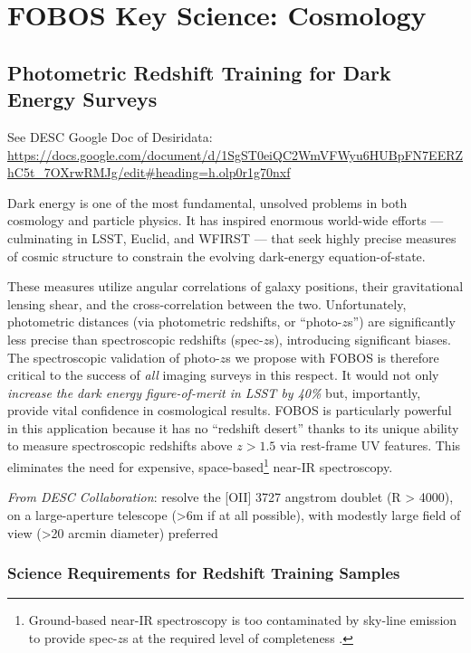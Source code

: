 \documentclass[preprint,11pt]{aastex}
\begin{document}
\section{FOBOS Key Science: Cosmology } \label{sec:cosmology}

\subsection{Photometric Redshift Training for Dark Energy Surveys}
\label{sec:photoz}

See DESC Google Doc of Desiridata: \url{https://docs.google.com/document/d/1SgST0eiQC2WmVFWyu6HUBpFN7EERZhC5t\_7OXrwRMJg/edit\#heading=h.olp0r1g70nxf}

Dark energy is one of
the most fundamental, unsolved problems in both cosmology and particle
physics.  It has inspired enormous world-wide efforts --- culminating in
LSST, Euclid, and WFIRST --- that seek highly precise measures of cosmic
structure to constrain the evolving dark-energy equation-of-state.

These measures utilize angular correlations of galaxy positions, their
gravitational lensing shear, and the cross-correlation between the two.
Unfortunately, photometric distances (via photometric redshifts, or
``photo-$z$s'') are significantly less precise than spectroscopic
redshifts (spec-$z$s), introducing significant biases.  The
spectroscopic validation of photo-$z$s we propose with FOBOS is
therefore critical to the success of {\it all} imaging surveys in this
respect. It would not only \emph{increase the dark energy
figure-of-merit in LSST by 40\%} \citep{newman15} but, importantly,
provide vital confidence in cosmological results.  FOBOS is particularly
powerful in this application because it has no ``redshift desert'' thanks to its unique ability to measure spectroscopic redshifts above $z > 1.5$ via
rest-frame UV features.  This eliminates the need for expensive, space-based\footnote{Ground-based near-IR
spectroscopy is too contaminated by sky-line emission to provide spec-$z$s at the required level of completeness
\citep{newman15}.} near-IR spectroscopy.


\emph{From DESC Collaboration}: resolve the [OII] 3727 angstrom doublet (R > 4000), on a large-aperture telescope (>6m if at all possible), with modestly large field of view (>20 arcmin diameter) preferred


\subsubsection{Science Requirements for Redshift Training Samples}
\end{document}
